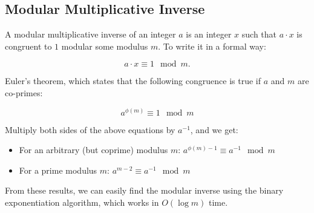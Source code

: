 \subsection{Modular Multiplicative Inverse}

A modular multiplicative inverse of an integer $a$ is an integer $x$ such that
$a \cdot x$ is congruent to $1$ modular some modulus $m$. To write it in a
formal way:

\[a \cdot x \equiv 1 \mod m.\]

Euler's theorem, which states that the following congruence is true if $a$ and
$m$ are co-primes:

\[a^{\phi (m)} \equiv 1 \mod m\]

Multiply both sides of the above equations by $a^{-1}$, and we get:

\begin{itemize}
    \item For an arbitrary (but coprime) modulus $m$: $a^{\phi(m)-1} \equiv a^{-1}\mod m$
    \item For a prime modulus $m$: $a^{m - 2} \equiv a^{-1} \mod m$
\end{itemize}

From these results, we can easily find the modular inverse using the binary
exponentiation algorithm, which works in $O(\log m)$ time.
